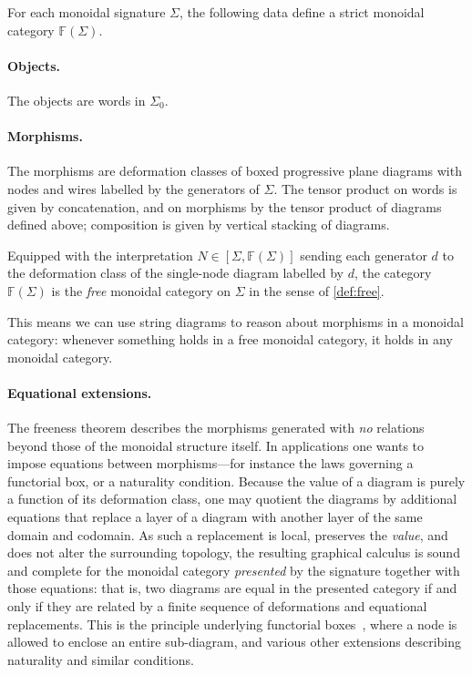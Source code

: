 \begin{theorem}\label{theorem:free_string_planar}
For each monoidal signature $\Sigma$, the following data define a strict monoidal
category $\mathbb{F}(\Sigma)$.
\paragraph{Objects.} The objects are words in $\Sigma_{0}$.
\paragraph{Morphisms.} The morphisms are deformation classes of boxed progressive
plane diagrams with nodes and wires labelled by the generators of $\Sigma$.
The tensor product on words is given by concatenation, and on morphisms by the
tensor product of diagrams defined above; composition is given by vertical
stacking of diagrams.

Equipped with the interpretation $N \in [\Sigma, \mathbb{F}(\Sigma)]$ sending each
generator $d$ to the deformation class of the single-node diagram labelled by
$d$, the category $\mathbb{F}(\Sigma)$ is the \emph{free} monoidal category on
$\Sigma$ in the sense of \cref{def:free}.
\end{theorem}
This means we can use string diagrams to reason about morphisms in a monoidal category: whenever something holds in a free monoidal category, it holds in any monoidal category.

\paragraph{Equational extensions.}
The freeness theorem describes the morphisms generated with \emph{no} relations
beyond those of the monoidal structure itself. In applications one wants to
impose equations between morphisms---for instance the laws governing a functorial
box, or a naturality condition. Because the value of a diagram is purely a
function of its deformation class, one may quotient the diagrams by additional
equations that replace a layer of a diagram with another layer of the same domain
and codomain. As such a replacement is local, preserves the \emph{value}, and
does not alter the surrounding topology, the resulting graphical calculus is
sound and complete for the monoidal category \emph{presented} by the signature
together with those equations: that is, two diagrams are equal in the presented
category if and only if they are related by a finite sequence of deformations and
equational replacements. This is the principle underlying functorial
boxes~\cite{mellies_functorial_2006}, where a node is allowed to enclose an
entire sub-diagram, and various other extensions describing naturality and
similar conditions.

